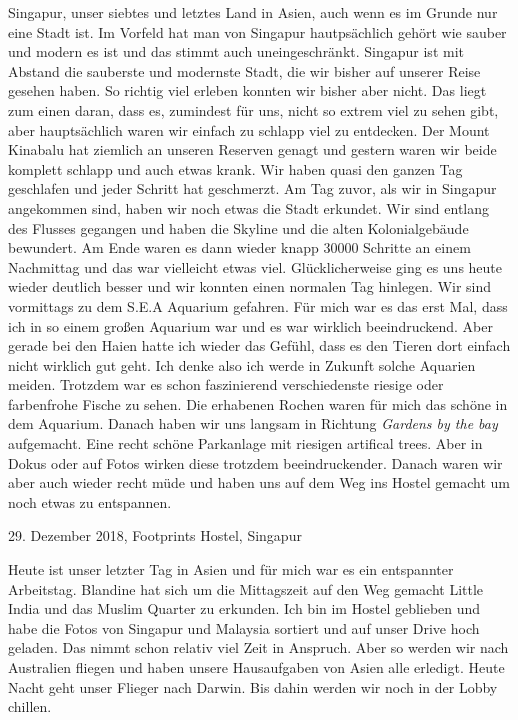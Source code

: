 \documentclass[11pt]{book}
\begin{document}
Singapur, unser siebtes und letztes Land in Asien, auch wenn es im Grunde nur eine Stadt ist. Im Vorfeld hat man von Singapur 
hautpsächlich gehört wie sauber und modern es ist und das stimmt auch uneingeschränkt. Singapur ist mit Abstand die sauberste und 
modernste Stadt, die wir bisher auf unserer Reise gesehen haben. So richtig viel erleben konnten wir bisher aber nicht. Das liegt 
zum einen daran, dass es, zumindest für uns, nicht so extrem viel zu sehen gibt, aber hauptsächlich waren wir einfach zu schlapp viel 
zu entdecken. Der Mount Kinabalu hat ziemlich an unseren Reserven genagt und gestern waren wir beide komplett schlapp und auch etwas 
krank. Wir haben quasi den ganzen Tag geschlafen und jeder Schritt hat geschmerzt. Am Tag zuvor, als wir in Singapur angekommen sind, 
haben wir noch etwas die Stadt erkundet. Wir sind entlang des Flusses gegangen und haben die Skyline und die alten Kolonialgebäude bewundert. 
Am Ende waren es dann wieder knapp 30000 Schritte an einem Nachmittag und das war vielleicht etwas viel. Glücklicherweise ging es uns 
heute wieder deutlich besser und wir konnten einen normalen Tag hinlegen. Wir sind vormittags zu dem S.E.A Aquarium gefahren. Für mich 
war es das erst Mal, dass ich in so einem großen Aquarium war und es war wirklich beeindruckend. Aber gerade bei den Haien hatte ich 
wieder das Gefühl, dass es den Tieren dort einfach nicht wirklich gut geht. Ich denke also ich werde in Zukunft solche Aquarien meiden. 
Trotzdem war es schon faszinierend verschiedenste riesige oder farbenfrohe Fische zu sehen. Die erhabenen Rochen waren für mich 
das schöne in dem Aquarium. Danach haben wir uns langsam in Richtung \emph{Gardens by the bay} aufgemacht. Eine recht schöne 
Parkanlage mit riesigen artifical trees. Aber in Dokus oder auf Fotos wirken diese trotzdem beeindruckender. Danach waren wir aber 
auch wieder recht müde und haben uns auf dem Weg ins Hostel gemacht um noch etwas zu entspannen.

29. Dezember 2018, Footprints Hostel, Singapur

Heute ist unser letzter Tag in Asien und für mich war es ein entspannter Arbeitstag. Blandine hat sich um die Mittagszeit auf den Weg 
gemacht Little India und das Muslim Quarter zu erkunden. Ich bin im Hostel geblieben und habe die Fotos von Singapur und Malaysia sortiert 
und auf unser Drive hoch geladen. Das nimmt schon relativ viel Zeit in Anspruch. Aber so werden wir nach Australien fliegen und 
haben unsere Hausaufgaben von Asien alle erledigt. Heute Nacht geht unser Flieger nach Darwin. Bis dahin werden wir noch in der Lobby 
chillen.
\end{document}
